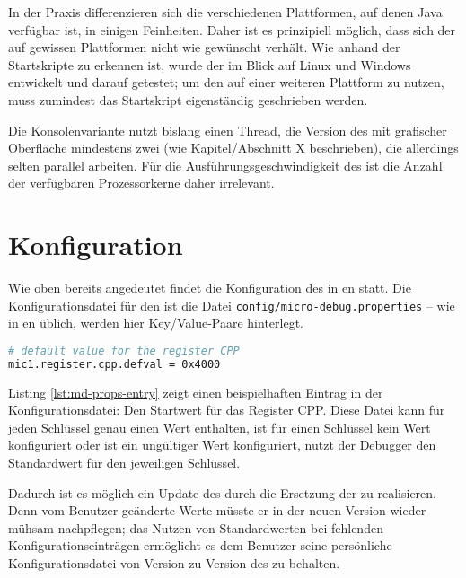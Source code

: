 In der Praxis differenzieren sich die verschiedenen Plattformen, auf denen Java verfügbar ist, in einigen Feinheiten. Daher ist es prinzipiell möglich, dass sich der \md{} auf gewissen Plattformen nicht wie gewünscht verhält. Wie anhand der Startskripte zu erkennen ist, wurde der \md{} im Blick auf Linux und Windows entwickelt und darauf getestet; um den \md{} auf einer weiteren Plattform zu nutzen, muss zumindest das Startskript eigenständig geschrieben werden.

Die Konsolenvariante nutzt bislang einen Thread, die Version des \md{} mit grafischer Oberfläche mindestens zwei (wie Kapitel/Abschnitt X beschrieben), die allerdings selten parallel arbeiten. Für die Ausführungsgeschwindigkeit des \md{} ist die Anzahl der verfügbaren Prozessorkerne daher irrelevant.

\section{Konfiguration}
\label{konfiguration}
Wie oben bereits angedeutet findet die Konfiguration des \md{} in en statt. Die Konfigurationsdatei für den \md{} ist die Datei \texttt{config/micro-debug.properties} -- wie in en üblich, werden hier Key/Value-Paare hinterlegt.

\begin{lstlisting}[language=sh,caption={Eintrag in \texttt{conf/micro-debug.properties}},label=lst:md-props-entry]
# default value for the register CPP
mic1.register.cpp.defval = 0x4000
\end{lstlisting}

Listing \ref{lst:md-props-entry} zeigt einen beispielhaften Eintrag in der Konfigurationsdatei: Den Startwert für das Register CPP. Diese Datei kann für jeden Schlüssel genau einen Wert enthalten, ist für einen Schlüssel kein Wert konfiguriert oder ist ein ungültiger Wert konfiguriert, nutzt der Debugger den Standardwert für den jeweiligen Schlüssel.

Dadurch ist es möglich ein Update des \md{} durch die Ersetzung der  zu realisieren. Denn vom Benutzer geänderte Werte müsste er in der neuen Version wieder mühsam nachpflegen; das Nutzen von Standardwerten bei fehlenden Konfigurationseinträgen ermöglicht es dem Benutzer seine persönliche Konfigurationsdatei von Version zu Version des \md{} zu behalten.

